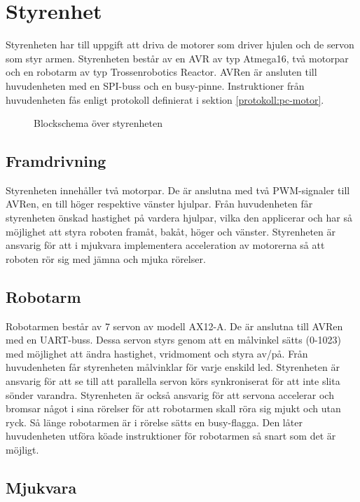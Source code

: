 \section{Styrenhet}
Styrenheten har till uppgift att driva de motorer som driver hjulen och de servon som styr armen. Styrenheten består av en AVR av typ Atmega16, två motorpar och en robotarm av typ Trossenrobotics Reactor. AVRen är ansluten till huvudenheten med en SPI-buss och en busy-pinne. Instruktioner från huvudenheten fås enligt protokoll definierat i sektion \ref{protokoll:pc-motor}. 

\begin{figure}[H]
\center

\caption{Blockschema över styrenheten}
\end{figure}

\subsection{Framdrivning}

Styrenheten innehåller två motorpar. De är anslutna med två PWM-signaler till AVRen, en till höger respektive vänster hjulpar. Från huvudenheten får styrenheten önskad hastighet på vardera hjulpar, vilka den applicerar och har så möjlighet att styra roboten framåt, bakåt, höger och vänster. Styrenheten är ansvarig för att i mjukvara implementera acceleration av motorerna så att roboten rör sig med jämna och mjuka rörelser.

\subsection{Robotarm}

Robotarmen består av 7 servon av modell AX12-A. De är anslutna till AVRen med en UART-buss. Dessa servon styrs genom att en målvinkel sätts (0-1023) med möjlighet att ändra hastighet, vridmoment och styra av/på. Från huvudenheten får styrenheten målvinklar för varje enskild led. Styrenheten är ansvarig för att se till att parallella servon körs synkroniserat för att inte slita sönder varandra. Styrenheten är också ansvarig för att servona accelerar och bromsar något i sina rörelser för att robotarmen skall röra sig mjukt och utan ryck. Så länge robotarmen är i rörelse sätts en busy-flagga. Den låter huvudenheten utföra köade instruktioner för robotarmen så snart som det är möjligt. 

\subsection{Mjukvara}

